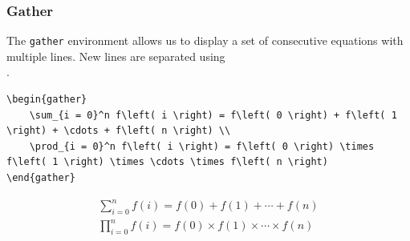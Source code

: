 \documentclass[11pt, twoside]{article}
\begin{document}
\subsubsection{Gather}
The \texttt{gather} environment allows us to display a set of
consecutive equations with multiple lines. New lines are separated
using \texttt{\\}.
\begin{verbatim}
\begin{gather}
    \sum_{i = 0}^n f\left( i \right) = f\left( 0 \right) + f\left( 1 \right) + \cdots + f\left( n \right) \\
    \prod_{i = 0}^n f\left( i \right) = f\left( 0 \right) \times f\left( 1 \right) \times \cdots \times f\left( n \right)
\end{gather}
\end{verbatim}
\begin{outputbox}
    \begin{gather}
        \sum_{i = 0}^n f\left( i \right) = f\left( 0 \right) + f\left( 1 \right) + \cdots + f\left( n \right) \\
        \prod_{i = 0}^n f\left( i \right) = f\left( 0 \right) \times f\left( 1 \right) \times \cdots \times f\left( n \right)
    \end{gather}
\end{outputbox}
\newpage
\end{document}
